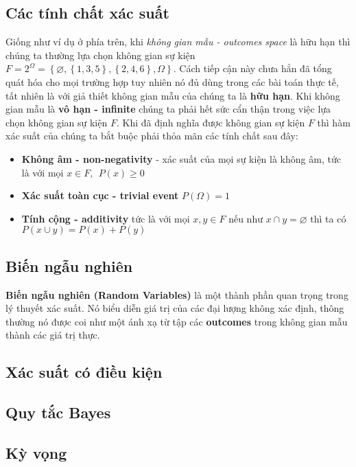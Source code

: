 \documentclass[../main-report.tex]{subfiles}
\begin{document}
\subsection{Các tính chất xác suất}
Giống như ví dụ ở phía trên, khi \textit{không gian mẫu - outcomes space} là hữu hạn thì chúng ta thường lựa chọn không gian sự kiện $F=2^{\Omega} = \left \{ \varnothing , \left \{ 1, 3, 5 \right \}, \left \{ 2, 4, 6 \right \}, \Omega \right \}$. Cách tiếp cận này chưa hẳn đã tổng quát hóa cho mọi trường hợp tuy nhiên nó đủ dùng trong các bài toán thực tế, tất nhiên là với giả thiết không gian mẫu của chúng ta là \textbf{hữu hạn}. Khi không gian mẫu là\textbf{ vô hạn - infinite} chúng ta phải hết sức cẩn thận trong việc lựa chọn không gian sự kiện $F$. Khi đã định nghĩa được không gian sự kiện $F$ thì hàm xác suất của chúng ta bắt buộc phải thỏa mãn các tính chất sau đây:

\begin{itemize}
\item \textbf{Không âm - non-negativity} - xác suất của mọi sự kiện là không âm, tức là với mọi $x \in F,~~ P(x)\geq 0$
\item \textbf{Xác suất toàn cục - trivial event} $P(\Omega) = 1$
\item \textbf{Tính cộng - additivity} tức là với mọi $x, y \in F$ nếu như $x\cap y= \varnothing$ thì ta có $P(x\cup y) = P(x) + P(y)$
\end{itemize}
\subsection{Biến ngẫu nghiên}
\textbf{Biến ngẫu nghiên (Random Variables)} là một thành phần quan trọng trong lý thuyết xác suất. Nó biểu diễn giá trị của các đại lượng không xác định, thông thường nó được coi như một ánh xạ từ tập các \textbf{outcomes} trong không gian mẫu thành các giá trị thực.


\subsection{Xác suất có điều kiện}

\subsection{Quy tắc Bayes}

\subsection{Kỳ vọng}
\end{document}
